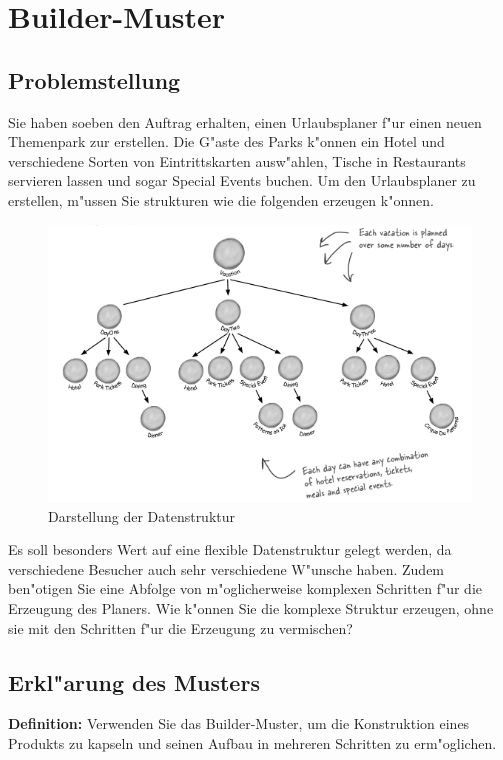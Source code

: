 \section{Builder-Muster}

\subsection{Problemstellung}
Sie haben soeben den Auftrag erhalten, einen Urlaubsplaner f"ur einen neuen Themenpark zur erstellen. Die G"aste des Parks k"onnen ein Hotel und verschiedene Sorten von Eintrittskarten ausw"ahlen, Tische in Restaurants servieren lassen und sogar Special Events buchen. Um den Urlaubsplaner zu erstellen, m"ussen Sie strukturen wie die folgenden erzeugen k"onnen. 

\begin{figure} [!htb]
	\centering
	\includegraphics[width=.9\linewidth]{builder/img/builder}
	\caption{Darstellung der Datenstruktur}
	\label{fig:builder}
\end{figure}

Es soll besonders Wert auf eine flexible Datenstruktur gelegt werden, da verschiedene Besucher auch sehr verschiedene W"unsche haben. Zudem ben"otigen Sie eine Abfolge von m"oglicherweise komplexen Schritten f"ur die Erzeugung des Planers. Wie k"onnen Sie die komplexe Struktur erzeugen, ohne sie mit den Schritten f"ur die Erzeugung zu vermischen?

\subsection{Erkl"arung des Musters}
\textbf{Definition:} Verwenden Sie das Builder-Muster, um die Konstruktion eines Produkts zu kapseln und seinen Aufbau in mehreren Schritten zu erm"oglichen.

